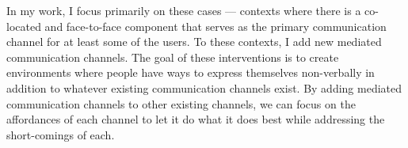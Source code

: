


In my work, I focus primarily on these cases --- contexts where there is a co-located and face-to-face component that serves as the primary communication channel for at least some of the users. To these contexts, I add new mediated communication channels. The goal of these interventions is to create environments where people have ways to express themselves non-verbally in addition to whatever existing communication channels exist. By adding mediated communication channels to other existing channels, we can focus on the affordances of each channel to let it do what it does best while addressing the short-comings of each.



